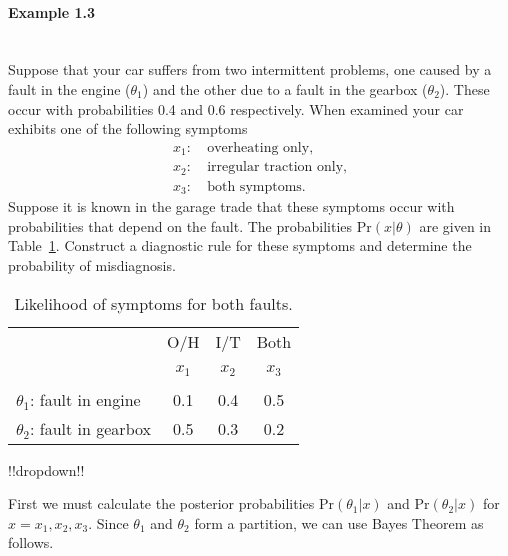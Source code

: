 \paragraph{Example 1.3}{~\\
Suppose that your car suffers from two intermittent problems, one
caused by a fault in the engine ($\theta_1$) and the other due to a
fault in the gearbox ($\theta_2$). These occur with probabilities 0.4
and 0.6 respectively. When examined your car exhibits one of the
following symptoms
\begin{align*}
x_1:&~\text{overheating only}, \\
x_2:&~\text{irregular traction only}, \\
x_3:&~\text{both symptoms}.
\end{align*}
Suppose it is known in the garage trade that these symptoms occur with
probabilities that depend on the fault. The probabilities
$\text{Pr}(x|\theta)$ are given in Table~\ref{tab:garagelik}. Construct a
diagnostic rule for these symptoms and determine the probability of
misdiagnosis.
\begin{table}[h]
\bigskip

\begin{tabular}{|l|ccc|}
\cline{2-4}
\multicolumn{1}{c|}{~}& O/H & I/T & Both \\
\multicolumn{1}{c|}{~}& $x_1$ & $x_2$ & $x_3$ \\
\hline
$\theta_1$: fault in engine & 0.1 & 0.4 & 0.5 \\
\hline
$\theta_2$: fault in gearbox & 0.5 & 0.3 & 0.2 \\
\hline
\end{tabular}
\caption{Likelihood of symptoms for both faults.}
\label{tab:garagelik}

\end{table}





!!dropdown!!

First we must calculate the posterior probabilities $\text{Pr}(\theta_1|x)$
    and $\text{Pr}(\theta_2|x)$ for $x=x_1,x_2,x_3$. Since $\theta_1$ and
    $\theta_2$ form a partition, we can use Bayes Theorem as follows.
    
}
